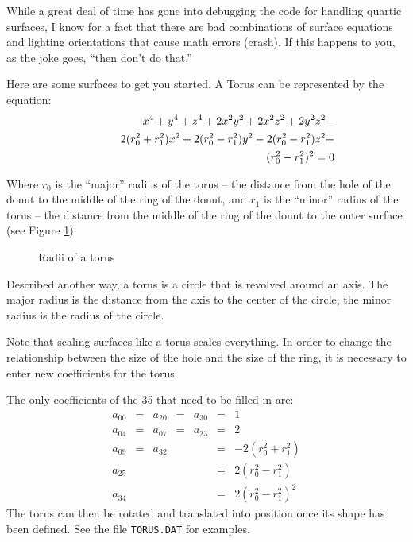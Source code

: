 While a great deal of time has gone into debugging the code for handling
quartic surfaces, I know for a fact that there are bad combinations of
surface equations and lighting orientations that cause math errors (crash).
If this happens to you, as the joke goes, ``then don't do that.''

Here are some surfaces to get you started. A Torus can be represented
by the equation:
\begin{eqnarray*}
& & x^{4} + y^{4} + z^{4} + 2x^{2}y^{2} + 2x^{2}z^{2} + 2y^{2}z^{2} - \\
& & 2(r_{0}^{2} + r_{1}^{2})x^{2}
+ 2(r_{0}^{2} - r_{1}^{2})y^{2}
- 2(r_{0}^{2} - r_{1}^{2})z^{2} + \\
& & \hspace*{2.2in}(r_{0}^{2} - r_{1}^{2})^{2} = 0 
\end{eqnarray*}

Where $r_{0}$ is the ``major'' radius of the torus -- the distance
from the hole of the donut to the middle of the ring of the donut, and
$r_{1}$ is the ``minor'' radius of the torus -- the distance from the
middle of the ring of the donut to the outer surface (see Figure
\ref{torus}).
\begin{figure}[htbp]
\begin{centering}

\caption{Radii of a torus}
\label{torus}
\end{centering}
\end{figure}
Described
another way, a torus is a circle that is revolved around an axis.  The
major radius is the distance from the axis to the center of the
circle, the minor radius is the radius of the circle.

Note that scaling surfaces like a torus scales everything. In order to change
the relationship between the size of the hole and the size of the ring, it is
necessary to enter new coefficients for the torus.

The only coefficients of the 35 that need to be filled in
are:
\begin{displaymath}
\begin{array}{ccccccl}
a_{00} & = & a_{20} & = & a_{30} & = & 1 \\
a_{04} & = & a_{07} & = & a_{23} & = & 2 \\
a_{09} & = & a_{32} &   &        & = & -2(r_{0}^{2} + r_{1}^{2}) \\
a_{25} &   &        &   &        & = & 2(r_{0}^{2} - r_{1}^{2}) \\
a_{34} &   &        &   &        & = & 2(r_{0}^{2} - r_{1}^{2})^{2}
\end{array}
\end{displaymath}
The torus can then be rotated and translated into position once its shape
has been defined. See the file {\tt TORUS.DAT} for examples.

